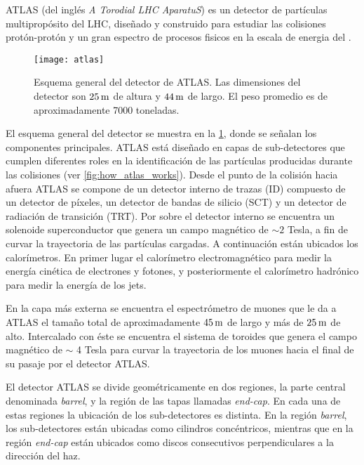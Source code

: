 ATLAS (del inglés \emph{A Torodial LHC AparatuS}) es un detector de partículas multipropósito del LHC,
diseñado y construido para estudiar las colisiones protón-protón y un gran espectro de procesos fisicos
en la escala de energia del \tev.

\begin{figure}[!htbp]
  \centering

  \texttt{[image: atlas]}
  \caption{Esquema general del detector de ATLAS. Las dimensiones del detector
  son $\unit[25]{m}$ de altura y $\unit[44]{m}$ de largo. El peso promedio es de aproximadamente 7000 toneladas.}\label{fig:atlas}

\end{figure}

El esquema general del detector se muestra en la \cref{fig:atlas}, donde se
señalan los componentes principales. ATLAS está diseñado en capas de
sub-detectores que cumplen diferentes roles en la identificación de las
partículas producidas durante las colisiones (ver \cref{fig:how_atlas_works}).
Desde el punto de la colisión
hacia afuera ATLAS se compone de un detector interno de trazas (ID) compuesto de
un detector de píxeles, un detector de bandas de silicio (SCT) y un detector de
radiación de transición (TRT).
Por sobre el detector interno se encuentra un
solenoide superconductor que genera un campo magnético de $\sim 2$ Tesla, a fin
de curvar la trayectoria de las partículas cargadas.
A continuación están ubicados los calorímetros. En primer lugar el calorímetro
electromagnético para medir la energía cinética de electrones y fotones, y
posteriormente el calorímetro hadrónico para medir la energía de los jets.

En la capa más externa se encuentra el espectrómetro de muones que le da a ATLAS
el tamaño total de aproximadamente $\unit[45]{m}$ de largo y más de
$\unit[25]{m}$ de alto. Intercalado con éste se encuentra el sistema de toroides
que genera el campo magnético de $\sim$ 4 Tesla para curvar la trayectoria de
los muones hacia el final de su pasaje por el detector ATLAS.

El detector ATLAS se divide geométricamente en dos regiones, la parte central
denominada \emph{barrel}, y la región de las tapas llamadas \emph{end-cap}.
En cada una de estas regiones la ubicación de los
sub-detectores es distinta. En la región \emph{barrel}, los sub-detectores están
ubicadas como cilindros concéntricos, mientras que en la región \emph{end-cap}
están ubicados como discos consecutivos perpendiculares a la dirección del haz.


